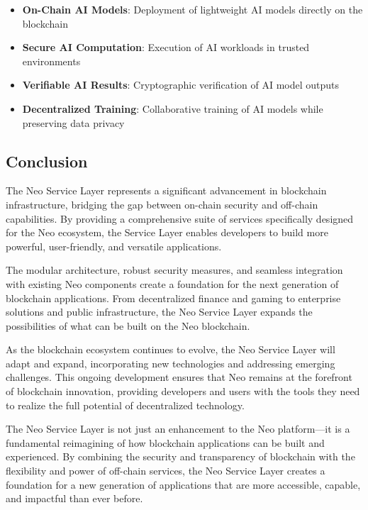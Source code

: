 \begin{itemize}
    \item \textbf{On-Chain AI Models}: Deployment of lightweight AI models directly on the blockchain
    \item \textbf{Secure AI Computation}: Execution of AI workloads in trusted environments
    \item \textbf{Verifiable AI Results}: Cryptographic verification of AI model outputs
    \item \textbf{Decentralized Training}: Collaborative training of AI models while preserving data privacy
\end{itemize}

\subsection{Conclusion}
\label{subsec:nsl-conclusion}

The Neo Service Layer represents a significant advancement in blockchain infrastructure, bridging the gap between on-chain security and off-chain capabilities. By providing a comprehensive suite of services specifically designed for the Neo ecosystem, the Service Layer enables developers to build more powerful, user-friendly, and versatile applications.

The modular architecture, robust security measures, and seamless integration with existing Neo components create a foundation for the next generation of blockchain applications. From decentralized finance and gaming to enterprise solutions and public infrastructure, the Neo Service Layer expands the possibilities of what can be built on the Neo blockchain.

As the blockchain ecosystem continues to evolve, the Neo Service Layer will adapt and expand, incorporating new technologies and addressing emerging challenges. This ongoing development ensures that Neo remains at the forefront of blockchain innovation, providing developers and users with the tools they need to realize the full potential of decentralized technology.

The Neo Service Layer is not just an enhancement to the Neo platform—it is a fundamental reimagining of how blockchain applications can be built and experienced. By combining the security and transparency of blockchain with the flexibility and power of off-chain services, the Neo Service Layer creates a foundation for a new generation of applications that are more accessible, capable, and impactful than ever before.

